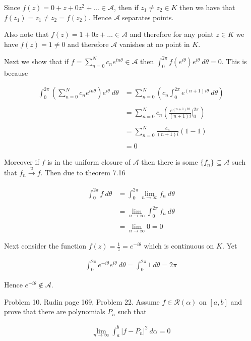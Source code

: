 \documentclass{article}
\begin{document}
 \vspace{1cm} 

 Since $f(z) = 0+z+0z^2+\dots\in \mathscr A$, then if $z_1\ne z_2\in K$ then we have that $f(z_1)=z_1\ne z_2 = f(z_2)$.  Hence $\mathscr A$ separates points.  

 Also note that $f(z)=1+0z+\dots\in \mathscr A$ and therefore for any point $z\in K$ we have $f(z)=1\ne 0$ and therefore $\mathscr A$ vanishes at no point in $K$.  

Next we show that if $f=\sum_{n=0}^N c_n e^{in\theta}\in\mathscr A$ then $\int_0^{2\pi}f(e^{i\theta})e^{i\theta} \ d\theta=0$.  This is because 

\begin{align*}
  \int_0^{2\pi} \left(\sum_{n=0}^N c_ne^{in\theta}\right)e^{i\theta} \ d \theta &= \sum_{n=0}^N \left(c_n \int_0^{2\pi}e^{(n+1)i\theta} \ d\theta\right) \\\\
  &=\sum_{n=0}^Nc_n\left(\frac{e^{(n+1)i\theta}}{(n+1)i}\Bigg|_{0}^{2\pi} \right) \\\\
  &= \sum_{n=0}^N \frac{c_n}{(n+1)i}(1-1) \\\\
  &= 0
\end{align*}

Moreover if $f$ is in the uniform closure of $\mathscr A$ then there is some $\{f_n\}\subseteq \mathscr A$ such that $f_n\xrightarrow[]{u} f$.  Then due to theorem 7.16

\begin{align*}
  \int_0^{2\pi} f \ d\theta &= \int_0^{2\pi} \lim_{n\to\infty} f_n \ d\theta \\\\
  &= \lim_{n\to\infty} \int_0^{2\pi} f_n \ d\theta \\\\
  &= \lim_{n\to \infty} 0 = 0
\end{align*}


Next consider the function $f(z)= \frac 1 z = e^{-i\theta}$ which is continuous on $K$.  Yet 

\begin{align*}
  \int_0^{2\pi} e^{-i\theta}e^{i\theta} \ d\theta = \int_0^{2\pi} 1 \ d\theta = 2\pi
\end{align*}

Hence $e^{-i\theta}\not\in \mathscr A$.


  \pagebreak
  {\Large \color{Sepia} Problem 10. Rudin page 169, Problem 22. Assume $f\in\mathscr R(\alpha)$ on $[a,b]$ and prove that there are polynomials $P_n$ such that 
  
  \begin{align*}
    \lim_{n\to \infty}\int_a^b |f-P_n|^2 \ d\alpha = 0
  \end{align*}
  
  }
\end{document}
